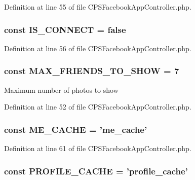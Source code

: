 Definition at line 55 of file CPSFacebookAppController.php.

\hypertarget{classCPSFacebookAppController_ac3a66a3e0e2e675b4aa12dec472b8dd0}{
\subsubsection[{IS\_\-CONNECT}]{\setlength{\rightskip}{0pt plus 5cm}const {\bf IS\_\-CONNECT} = false}}
\label{classCPSFacebookAppController_ac3a66a3e0e2e675b4aa12dec472b8dd0}


Definition at line 56 of file CPSFacebookAppController.php.

\hypertarget{classCPSFacebookAppController_a92f90cffdcf9bdc7042c27210d7bf711}{
\subsubsection[{MAX\_\-FRIENDS\_\-TO\_\-SHOW}]{\setlength{\rightskip}{0pt plus 5cm}const {\bf MAX\_\-FRIENDS\_\-TO\_\-SHOW} = 7}}
\label{classCPSFacebookAppController_a92f90cffdcf9bdc7042c27210d7bf711}
Maximum number of photos to show 

Definition at line 52 of file CPSFacebookAppController.php.

\hypertarget{classCPSFacebookAppController_a3fefc47757aedf92a1e71a894503a9e0}{
\subsubsection[{ME\_\-CACHE}]{\setlength{\rightskip}{0pt plus 5cm}const {\bf ME\_\-CACHE} = 'me\_\-cache'}}
\label{classCPSFacebookAppController_a3fefc47757aedf92a1e71a894503a9e0}


Definition at line 61 of file CPSFacebookAppController.php.

\hypertarget{classCPSFacebookAppController_a566d4822d1e8b1e6a916007a2be84878}{
\subsubsection[{PROFILE\_\-CACHE}]{\setlength{\rightskip}{0pt plus 5cm}const {\bf PROFILE\_\-CACHE} = 'profile\_\-cache'}}
\label{classCPSFacebookAppController_a566d4822d1e8b1e6a916007a2be84878}


